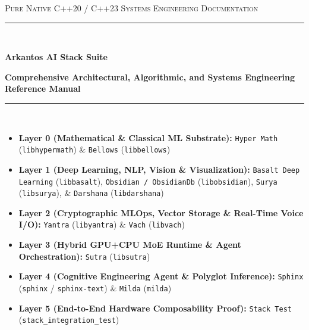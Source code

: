\documentclass[11pt,a4paper]{article}
\begin{document}
\begin{titlepage}
\centering
\vspace*{1.0cm}
{\scshape\Large Pure Native C++20 / C++23 Systems Engineering Documentation\par}
\vspace{0.6cm}
\rule{\textwidth}{1.5pt}\\[0.4cm]
{\Huge\sffamily\bfseries\color{arknavy} Arkantos AI Stack Suite\par}
\vspace{0.3cm}
{\Large\sffamily\bfseries\color{arkblue} Comprehensive Architectural, Algorithmic, and Systems Engineering Reference Manual\par}
\vspace{0.2cm}
\rule{\textwidth}{1.5pt}\\[0.8cm]

\begin{tcolorbox}[colback=arkgray,colframe=arknavy,title={\sffamily\bfseries Suite Scope \& Component Coverage (11 Native Engines + Stack Integration Proof)}]
\small
\begin{itemize}[leftmargin=1.5em,itemsep=2pt]
  \item \textbf{Layer 0 (Mathematical \& Classical ML Substrate):} \texttt{Hyper Math} (\texttt{libhypermath}) \& \texttt{Bellows} (\texttt{libbellows})
  \item \textbf{Layer 1 (Deep Learning, NLP, Vision \& Visualization):} \texttt{Basalt Deep Learning} (\texttt{libbasalt}), \texttt{Obsidian / ObsidianDb} (\texttt{libobsidian}), \texttt{Surya} (\texttt{libsurya}), \& \texttt{Darshana} (\texttt{libdarshana})
  \item \textbf{Layer 2 (Cryptographic MLOps, Vector Storage \& Real-Time Voice I/O):} \texttt{Yantra} (\texttt{libyantra}) \& \texttt{Vach} (\texttt{libvach})
  \item \textbf{Layer 3 (Hybrid GPU+CPU MoE Runtime \& Agent Orchestration):} \texttt{Sutra} (\texttt{libsutra})
  \item \textbf{Layer 4 (Cognitive Engineering Agent \& Polyglot Inference):} \texttt{Sphinx} (\texttt{sphinx} / \texttt{sphinx-text}) \& \texttt{Milda} (\texttt{milda})
  \item \textbf{Layer 5 (End-to-End Hardware Composability Proof):} \texttt{Stack Test} (\texttt{stack\_integration\_test})
\end{itemize}
\end{tcolorbox}


\end{titlepage}
\end{document}
